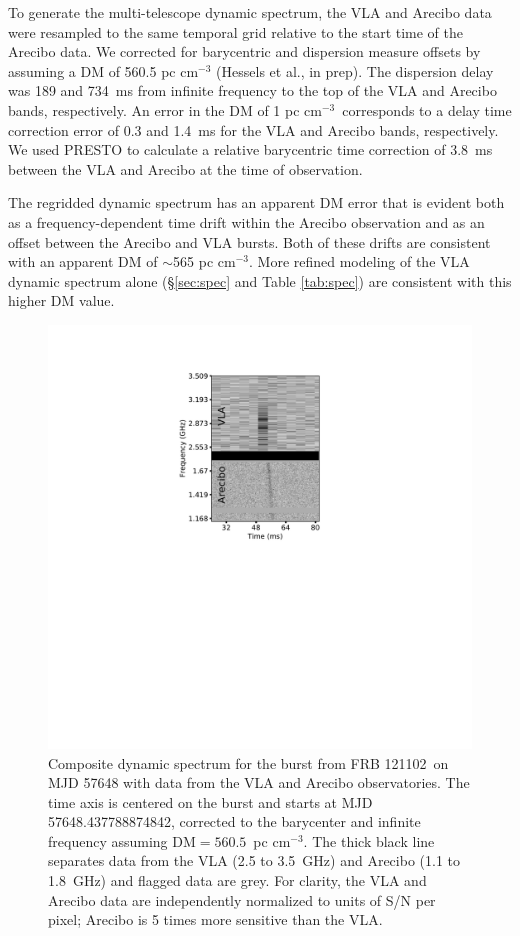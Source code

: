 \documentclass[twocolumn]{aastex61}
\newcommand{\frb}{FRB 121102}
\begin{document}
To generate the multi-telescope dynamic spectrum, the VLA and Arecibo data were resampled to the same temporal grid relative to the start time of the Arecibo data. We corrected for barycentric and dispersion measure offsets by assuming a DM of 560.5 pc cm$^{-3}$ (Hessels et al., in prep). The dispersion delay was 189 and 734~ms from infinite frequency to the top of the VLA and Arecibo bands, respectively. An error in the DM of 1 pc cm$^{-3}$\ corresponds to a delay time correction error of 0.3 and 1.4~ms for the VLA and Arecibo bands, respectively. We used PRESTO to calculate a relative barycentric time correction of 3.8~ms between the VLA and Arecibo at the time of observation.

The regridded dynamic spectrum has an apparent DM error that is evident both as a frequency-dependent time drift within the Arecibo observation and as an offset between the Arecibo and VLA bursts. Both of these drifts are consistent with an apparent DM of $\sim$565 pc cm$^{-3}$. More refined modeling of the VLA dynamic spectrum alone (\S \ref{sec:spec} and Table \ref{tab:spec}) are consistent with this higher DM value.

\begin{figure}[htb]
\begin{center}
 \includegraphics[trim=250 400 250 80, clip, width=\columnwidth]{aovla_spec.pdf}
 \caption{Composite dynamic spectrum for the burst from \frb\ on MJD 57648 with data from the VLA and Arecibo observatories. The time axis is centered on the burst and starts at MJD 57648.437788874842, corrected to the barycenter and infinite frequency assuming DM$=560.5$\ pc cm$^{-3}$. The thick black line separates data from the VLA (2.5 to 3.5~GHz) and Arecibo (1.1 to 1.8~GHz) and flagged data are grey. For clarity, the VLA and Arecibo data are independently normalized to units of S/N per pixel; Arecibo is 5 times more sensitive than the VLA.
 \label{fig:sgram}}
\end{center}
\end{figure}
\end{document}
